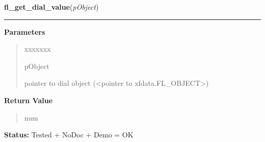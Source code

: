 \hspace{.8\funcindent}\begin{boxedminipage}{\funcwidth}

    \raggedright \textbf{fl\_get\_dial\_value}(\textit{pObject})

    \vspace{-1.5ex}

    \rule{\textwidth}{0.5\fboxrule}
\setlength{\parskip}{2ex}
\setlength{\parskip}{1ex}
      \textbf{Parameters}
      \vspace{-1ex}

      \begin{quote}
        \begin{Ventry}{xxxxxxx}

          \item[pObject]

          pointer to dial object ({\textless}pointer to 
          xfdata.FL\_OBJECT{\textgreater})

        \end{Ventry}

      \end{quote}

      \textbf{Return Value}
    \vspace{-1ex}

      \begin{quote}
      num

      \end{quote}

\textbf{Status:} Tested + NoDoc + Demo = OK



    \end{boxedminipage}

    \label{xformslib:library:fl_set_dial_bounds}

    \vspace{0.5ex}


